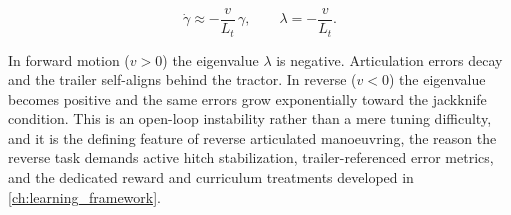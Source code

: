 \begin{equation}
    \dot{\gamma} \approx -\frac{v}{L_t}\,\gamma,
    \qquad \lambda = -\frac{v}{L_t} .
    \label{eq:hitch_eig}
\end{equation}

In forward motion ($v > 0$) the eigenvalue $\lambda$ is negative. Articulation errors decay
and the trailer self-aligns behind the tractor. In reverse ($v < 0$) the eigenvalue becomes
positive and the same errors grow exponentially toward the jackknife condition. This is an
open-loop instability rather than a mere tuning difficulty, and it is the defining feature of
reverse articulated manoeuvring, the reason the reverse task demands active hitch
stabilization, trailer-referenced error metrics, and the dedicated reward and curriculum
treatments developed in \cref{ch:learning_framework}.
